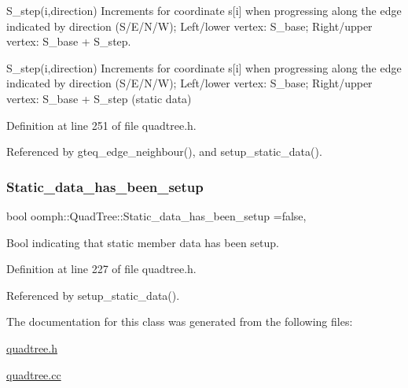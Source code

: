S\+\_\+step(i,direction) Increments for coordinate s\mbox{[}i\mbox{]} when progressing along the edge indicated by direction (S/\+E/\+N/W); Left/lower vertex\+: S\+\_\+base; Right/upper vertex\+: S\+\_\+base + S\+\_\+step. 

S\+\_\+step(i,direction) Increments for coordinate s\mbox{[}i\mbox{]} when progressing along the edge indicated by direction (S/\+E/\+N/W); Left/lower vertex\+: S\+\_\+base; Right/upper vertex\+: S\+\_\+base + S\+\_\+step (static data) 

Definition at line 251 of file quadtree.\+h.



Referenced by gteq\+\_\+edge\+\_\+neighbour(), and setup\+\_\+static\+\_\+data().

\mbox{\label{classoomph_1_1QuadTree_af41a83bfcd8c5eb535f7d2828ff712d1}} 
\subsubsection{\texorpdfstring{Static\+\_\+data\+\_\+has\+\_\+been\+\_\+setup}{Static\_data\_has\_been\_setup}}
{\footnotesize\ttfamily bool oomph\+::\+Quad\+Tree\+::\+Static\+\_\+data\+\_\+has\+\_\+been\+\_\+setup =false\hspace{0.3cm}{\ttfamily [static]}, {\ttfamily [protected]}}



Bool indicating that static member data has been setup. 



Definition at line 227 of file quadtree.\+h.



Referenced by setup\+\_\+static\+\_\+data().



The documentation for this class was generated from the following files\+:\begin{DoxyCompactItemize}
\item 
\hyperlink{quadtree_8h}{quadtree.\+h}\item 
\hyperlink{quadtree_8cc}{quadtree.\+cc}\end{DoxyCompactItemize}
